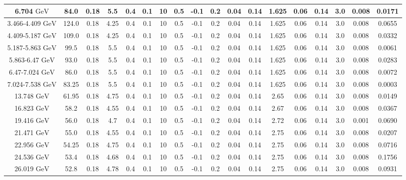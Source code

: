 \documentclass[11pt]{article}
\begin{document}
\begin{table}[htbp]
{\begin{tabular}{cccccccccccccccccc}
				6.704 ${\textrm{GeV}}$ & 84.0 & 0.18 & 5.5 & 0.4 & 0.1 & 10 & 0.5 & -0.1 & 0.2 & 0.04 & 0.14 & 1.625 & 0.06 & 0.14 & 3.0 & 0.008 & 0.0171 \\
				\midrule
				3.466-4.409 ${\textrm{GeV}}$ & 124.0 & 0.18 & 4.25 & 0.4 & 0.1 & 10 & 0.5 & -0.1 & 0.2 & 0.04 & 0.14  & 1.625 & 0.06 & 0.14 & 3.0 & 0.008 & 0.0655 \\
				4.409-5.187 ${\textrm{GeV}}$ & 109.0 & 0.18 & 4.25 & 0.4 & 0.1 & 10 & 0.5 & -0.1 & 0.2 & 0.04 & 0.14 & 1.625 & 0.06 & 0.14 & 3.0 & 0.008 & 0.0332 \\
				5.187-5.863 ${\textrm{GeV}}$ & 99.5 & 0.18 & 5.5 & 0.4 & 0.1 & 10 & 0.5 & -0.1 & 0.2 & 0.04 & 0.14 & 1.625 & 0.06 & 0.14 & 3.0 & 0.008 & 0.0061 \\
				5.863-6.47 ${\textrm{GeV}}$ & 93.0 & 0.18 & 5.5 & 0.4 & 0.1 & 10 & 0.5 & -0.1 & 0.2 & 0.04 & 0.14 & 1.625 & 0.06 & 0.14 & 3.0 & 0.008 & 0.0283 \\
				6.47-7.024 ${\textrm{GeV}}$ & 86.0 & 0.18 & 5.5 & 0.4 & 0.1 & 10 & 0.5 & -0.1 & 0.2 & 0.04 & 0.14 & 1.625 & 0.06 & 0.14 & 3.0 & 0.008 & 0.0072 \\
				7.024-7.538 ${\textrm{GeV}}$ & 83.25 & 0.18 & 5.5 & 0.4 & 0.1 & 10 & 0.5 & -0.1 & 0.2 & 0.04 & 0.14 & 1.625 & 0.06 & 0.14 & 3.0 & 0.008 & 0.0003 \\
				\midrule
				13.748 ${\textrm{GeV}}$ & 61.95 & 0.18 & 4.75 & 0.4 & 0.1 & 10 & 0.5 & -0.1 & 0.2 & 0.04 & 0.14 & 2.65 & 0.06 & 0.14 & 3.0 & 0.008 & 0.0149 \\
				16.823 ${\textrm{GeV}}$ & 58.2 & 0.18 & 4.55 & 0.4 & 0.1 & 10 & 0.5 & -0.1 & 0.2 & 0.04 & 0.14 & 2.67 & 0.06 & 0.14 & 3.0 & 0.008 & 0.0367 \\
				19.416 ${\textrm{GeV}}$ & 56.0 & 0.18 & 4.7 & 0.4 & 0.1 & 10 & 0.5 & -0.1 & 0.2 & 0.04 & 0.14 & 2.72 & 0.06 & 0.14 & 3.0 & 0.001 & 0.0690 \\
				21.471 ${\textrm{GeV}}$ & 55.0 & 0.18 & 4.55 & 0.4 & 0.1 & 10 & 0.5 & -0.1 & 0.2 & 0.04 & 0.14 & 2.75 & 0.06 & 0.14 & 3.0 & 0.008 & 0.0207 \\
				22.956 ${\textrm{GeV}}$ & 54.25 & 0.18 & 4.75 & 0.4 & 0.1 & 10 & 0.5 & -0.1 & 0.2 & 0.04 & 0.14 & 2.75 & 0.06 & 0.14 & 3.0 & 0.008 & 0.0716 \\
				24.536 ${\textrm{GeV}}$ & 53.4 & 0.18 & 4.68 & 0.4 & 0.1 & 10 & 0.5 & -0.1 & 0.2 & 0.04 & 0.14 & 2.75 & 0.06 & 0.14 & 3.0 & 0.008 & 0.1756 \\
				26.019 ${\textrm{GeV}}$ & 52.8 & 0.18 & 4.78 & 0.4 & 0.1 & 10 & 0.5 & -0.1 & 0.2 & 0.04 & 0.14 & 2.75 & 0.06 & 0.14 & 3.0 & 0.008 & 0.0931 \\
				\bottomrule
				\bottomrule
			\end{tabular}
}
\end{table}
\end{document}
